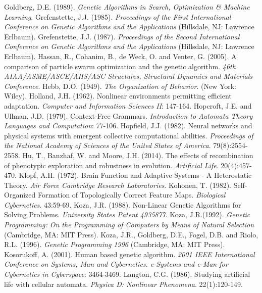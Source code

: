 \documentclass[spanish,a4paper,12pt,twoside]{report}
\begin{document}
\begin{thebibliography}{00}
   Goldberg, D.E. (1989). \emph{Genetic Algorithms in Search, Optimization \& Machine Learning}.
   Grefenstette, J.J. (1985). \emph{Proceedings of the First International Conference on Genetic Algorithms and the Applications} (Hillsdale, NJ: Lawrence Erlbaum).
   Grefenstette, J.J. (1987). \emph{Proceedings of the Second International Conference on Genetic Algorithms and the Applications} (Hillsdale, NJ: Lawrence Erlbaum).
   Hassan, R., Cohanim, B., de Weck, O. and Venter, G. (2005). A comparison of particle swarm optimization and the genetic algorithm. \emph{46th AIAA/ASME/ASCE/AHS/ASC Structures, Structural Dynamics and Materials Conference}.
   Hebb, D.O. (1949). \emph{The Organization of Behavior}. (New York: Wiley).
   Holland, J.H. (1962). Nonlinear environments permitting efficient adaptation. \emph{Computer and Information Sciences II}: 147-164.
   Hopcroft, J.E. and Ullman, J.D. (1979). Context-Free Grammars. \emph{Introduction to Automata Theory Languages and Computation}: 77-106.
   Hopfield, J.J. (1982). Neural networks and physical systems with emergent collective computational abilities. \emph{Proceedings of the National Academy of Sciences of the United States of America}. 79(8):2554-2558.
   Hu, T., Banzhaf, W. and Moore, J.H. (2014). The effects of recombination of phenotypic exploration and robustness in evolution. \emph{Artificial Life}. 20(4):457-470.
   Klopf, A.H. (1972). Brain Function and Adaptive Systems - A Heterostatic Theory. \emph{Air Force Cambridge Research Laboratories}.
   Kohonen, T. (1982). Self-Organized Formation of Topologically Correct Feature Maps. \emph{Biological Cybernetics}. 43:59-69.
   Koza, J.R. (1988). Non-Linear Genetic Algorithms for Solving Problems. \emph{University States Patent 4935877}.
   Koza, J.R.(1992). \emph{Genetic Programming: On the Programming of Computers by Means of Natural Selection}  (Cambridge, MA: MIT Press).
   Koza, J.R., Goldberg, D.E., Fogel, D.B. and Riolo, R.L. (1996). \emph{Genetic Programming 1996} (Cambridge, MA: MIT Press).
   Kosorukoff, A. (2001). Human based genetic algorithm. \emph{2001 IEEE International Conference on Systems, Man and Cybernetics. e-Systems and e-Man for Cybernetics in Cyberspace}: 3464-3469.
   Langton, C.G. (1986). Studying artificial life with cellular automata. \emph{Physica D: Nonlinear Phenomena}. 22(1):120-149.

\end{thebibliography}
\end{document}
